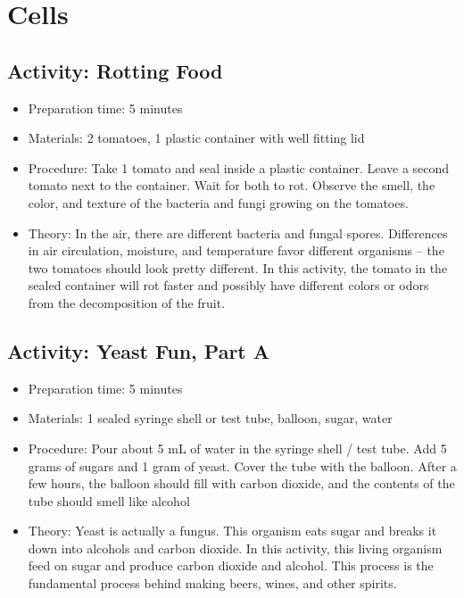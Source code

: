 \section{Cells}
\subsection{Activity: Rotting Food}
\begin{itemize}
\item{Preparation time: 5 minutes}
\item{Materials: 2 tomatoes, 1 plastic container with well fitting lid}
\item{Procedure: Take 1 tomato and seal inside a plastic container. Leave a second tomato next to the container. Wait for both to rot. Observe the smell, the color, and texture of the bacteria and fungi growing on the tomatoes.}
\item{Theory: In the air, there are different bacteria and fungal spores. Differences in air circulation, moisture, and temperature favor different organisms – the two tomatoes should look pretty different. In this activity, the tomato in the sealed container will rot faster and possibly have different colors or odors from the decomposition of the fruit.}
\end{itemize}


\subsection{Activity: Yeast Fun, Part A}
\begin{itemize}
\item{Preparation time: 5 minutes}
\item{Materials: 1 sealed syringe shell or test tube, balloon, sugar, water}
\item{Procedure: Pour about 5 mL of water in the syringe shell / test tube. Add 5 grams of sugars and 1 gram of yeast. Cover the tube with the balloon. After a few hours, the balloon should fill with carbon dioxide, and the contents of the tube should smell like alcohol}
\item{Theory: Yeast is actually a fungus. This organism eats sugar and breaks it down into alcohols and carbon dioxide. In this activity, this living organism feed on sugar and produce carbon dioxide and alcohol. This process is the fundamental process behind making beers, wines, and other spirits.}
\end{itemize}


